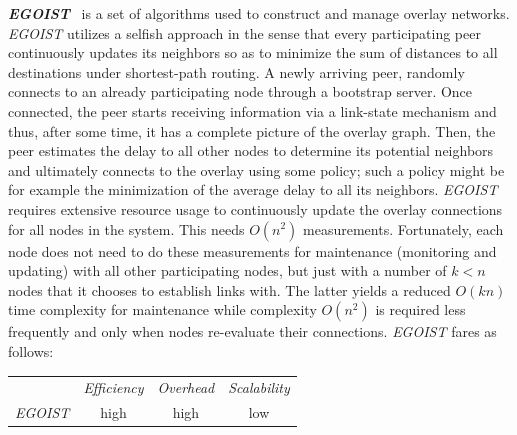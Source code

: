 \textbf{\emph{EGOIST}}~\cite{SLLBBR2008} is a set of algorithms used 
to construct and manage overlay networks. 
\emph{EGOIST} utilizes a selfish approach in the sense that every participating
peer continuously updates its neighbors so as to minimize the sum of distances
to all destinations under shortest-path routing. 
A newly arriving peer, randomly connects to an already participating 
node through a bootstrap server. Once connected, the peer starts receiving
information via a link-state mechanism and thus, after some time, 
it has a complete picture of the overlay graph. 
Then, the peer estimates the delay to all other nodes to
determine its potential neighbors and ultimately connects 
to the overlay using some policy; such a policy might be 
for example the minimization of the average delay to all its
neighbors. 
\emph{EGOIST} requires extensive resource usage to continuously
update the overlay connections for all nodes in the system. This needs
$O(n^2)$ measurements. 
Fortunately, each node does not need to do these
measurements for maintenance (monitoring and updating) with all other
participating nodes, but just with a number of $k<n$ nodes that it chooses to
establish links with. 
The latter yields a reduced $O(kn)$ time complexity for
maintenance while complexity $O(n^2)$ is required less frequently 
and only when nodes re-evaluate their connections.
%
\emph{EGOIST} fares as follows:
\begin{center}
{\footnotesize
\begin{tabular}{rccc}
\multicolumn{1}{r}{} &
\multicolumn{1}{c}{\emph{Efficiency}} &
\multicolumn{1}{c}{\emph{Overhead}} &
\multicolumn{1}{c}{\emph{Scalability}}
\\
\cline{2-4}
\emph{EGOIST} &
high &
high &
low
\end{tabular}
}
\end{center}

